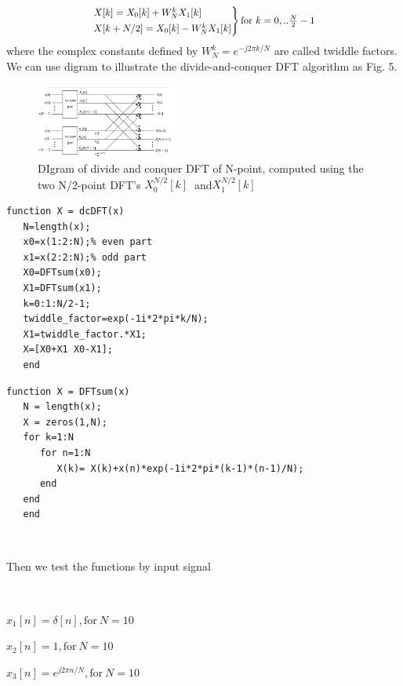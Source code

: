 \documentclass[journal]{IEEEtran}
\begin{document}
\[
   \scalebox{0.9}{
$\begin{rcases}
 X[k] = X_0[k] + W_N^k X_1[k] \\
X[k + N/2] = X_0[k] - W_N^k X_1[k]
\end{rcases}
\text{for } k = 0,..\frac{N}{2} - 1$
   }
\]
where the complex constants defined by \(W_N^k = e^{-j2\pi k/N}\)  are called twiddle factors.
We can use digram to illustrate the divide-and-conquer DFT algorithm as Fig. 5.
\begin{figure}[htbp]
   \centering
   \includegraphics[width=0.42\textwidth]{531.png} %
\caption{DIgram of divide and conquer DFT of N-point, computed using the two N/2-point DFT's $X_0^{N/2}[k]~$  and$ X_1^{N/2}[k]$}
   \label{fig:0}
 \end{figure}
\begin{lstlisting}[title={dcDFT.m},style=Matlab-editor]
   function X = dcDFT(x)
   N=length(x);
   x0=x(1:2:N);% even part
   x1=x(2:2:N);% odd part
   X0=DFTsum(x0);
   X1=DFTsum(x1);
   k=0:1:N/2-1;
   twiddle_factor=exp(-1i*2*pi*k/N);
   X1=twiddle_factor.*X1;
   X=[X0+X1 X0-X1];
   end
\end{lstlisting}
\begin{lstlisting}[title={DFTsum.m},style=Matlab-editor]
   function X = DFTsum(x)
   N = length(x);
   X = zeros(1,N);
   for k=1:N
      for n=1:N
         X(k)= X(k)+x(n)*exp(-1i*2*pi*(k-1)*(n-1)/N);
      end
   end
   end
\end{lstlisting}

$~$

Then we test the functions by input signal 

$~$

$x_1[n]=\delta[n], \text{for}\ N=10$

$x_2[n]=1, \text{for}\ N=10$

$x_3[n]=e^{j2\pi n/N}, \text{for}\ N=10$

$~$
\end{document}
